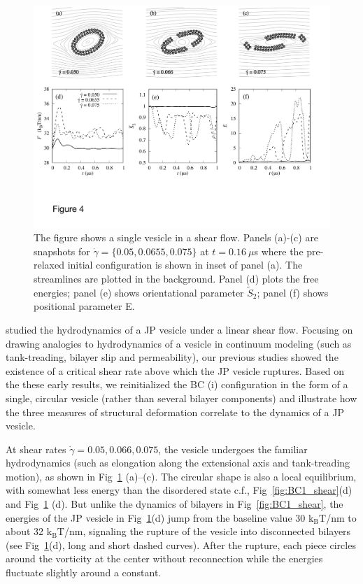 \documentclass[prb,preprint,showpacs,preprintnumbers,amsmath,amssymb,longbibliography]{revtex4-1}
\begin{document}
\begin{figure}
  \begin{center}
    \includegraphics[width=1.0\textwidth]{Figures/Figure4.pdf}
  \end{center}
  \caption{
    \label{fig:Ves_shear}
The figure shows a single vesicle in a shear flow. Panels (a)-(c) are snapshots for $\dot \gamma = \{0.05, 0.0655, 0.075\}$ at $t=0.16\ \mu$s where the pre-relaxed initial configuration is shown in inset of panel (a).
The streamlines are plotted in the background.
Panel (d) plots the free energies; panel (e) shows orientational parameter $\tilde{S}_2$; panel (f) shows positional parameter E.
     }
\end{figure}
%
\citet{Fu2022_JFM} studied the hydrodynamics of a JP vesicle under a linear shear flow. 
Focusing on drawing analogies to hydrodynamics of a vesicle in continuum modeling
(such as tank-treading, bilayer slip and permeability),
our previous studies showed the existence of a critical shear
rate above which the JP vesicle ruptures. 
Based on the these early results, we
reinitialized the BC (i) configuration
in the form of a single, circular vesicle (rather than several bilayer components)
and illustrate how the three measures of structural deformation 
correlate to the dynamics of a JP vesicle.

At shear rates $\dot\gamma=0.05, 0.066, 0.075$,
the vesicle undergoes the familiar hydrodynamics
(such as elongation along the extensional axis and tank-treading motion),
as shown in Fig~\ref{fig:Ves_shear} (a)--(c).
%
The circular shape is also a local equilibrium, with somewhat less
energy than the disordered state c.f.,
Fig~\ref{fig:BC1_shear}(d) and Fig~\ref{fig:Ves_shear} (d).
But unlike the dynamics of bilayers in Fig~\ref{fig:BC1_shear}, 
the energies of the JP vesicle in Fig~\ref{fig:Ves_shear}(d)
jump from the baseline value 30 $\mathrm{k_BT}$/nm to about 32 $\mathrm{k_BT}$/nm,
signaling the rupture of the vesicle into disconnected bilayers
(see Fig~\ref{fig:Ves_shear}(d), long and short dashed curves).
After the rupture, each piece circles around the vorticity at the center without reconnection while the energies fluctuate slightly around a constant.
\end{document}
